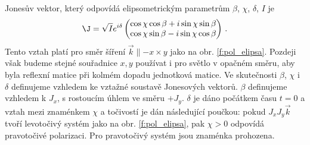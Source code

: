 Jonesův vektor, který odpovídá elipsometrickým parametrům $\beta$, $\chi$, $\delta$, $I$ je
\begin{equation} \label{e:jones uhly}
\J=\sqrt{I} e^{i\delta} \begin{pmatrix}
\cos \chi \cos \beta + i \sin \chi \sin \beta \\
\cos \chi \sin \beta - i \sin \chi \cos \beta
\end{pmatrix} \,.
\end{equation}
Tento vztah platí pro směr šíření $\vec{k} \parallel -x \times y$ jako na obr. \ref{f:pol_elipsa}.
Pozdeji však budeme stejné souřadnice $x,y$ používat i pro světlo v opačném směru, aby byla reflexní matice při kolmém dopadu jednotková matice.
Ve skutečnosti $\beta$, $\chi$ i $\delta$ definujeme vzhledem ke vztažné soustavě Jonesových vektorů.
$\beta$ definujeme vzhledem k $J_x$, s rostoucím úhlem ve směru $+J_y$.
$\delta$ je dáno počátkem času $t=0$ a vztah mezi znaménkem $\chi$ a točivostí je dán následující poučkou: pokud $J_x J_y \vec{k}$ tvoří levotočivý systém jako na obr. \ref{f:pol_elipsa}, pak $\chi>0$ odpovídá pravotočivé polarizaci.
Pro pravotočivý systém jsou znaménka prohozena.

